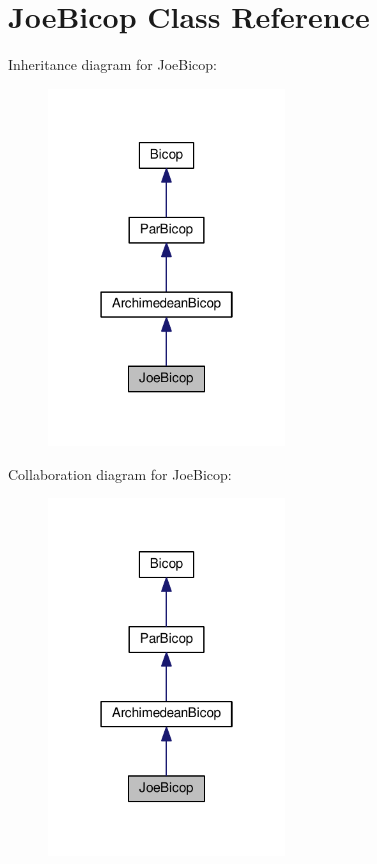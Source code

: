 \hypertarget{class_joe_bicop}{}\section{Joe\+Bicop Class Reference}
\label{class_joe_bicop}


Inheritance diagram for Joe\+Bicop\+:\nopagebreak
\begin{figure}[H]
\begin{center}
\leavevmode
\includegraphics[width=178pt]{class_joe_bicop__inherit__graph}
\end{center}
\end{figure}


Collaboration diagram for Joe\+Bicop\+:\nopagebreak
\begin{figure}[H]
\begin{center}
\leavevmode
\includegraphics[width=178pt]{class_joe_bicop__coll__graph}
\end{center}
\end{figure}
